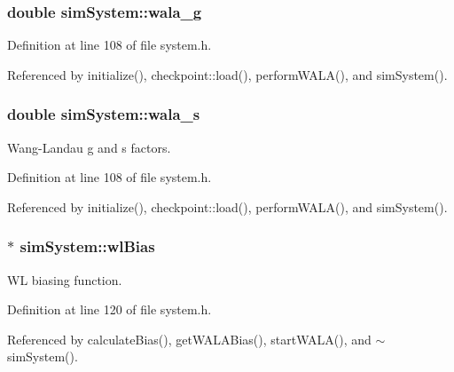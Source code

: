 \hypertarget{classsim_system_aa2e866e69ebe5fa0761894212592175a}{
\subsubsection[{wala\-\_\-g}]{\setlength{\rightskip}{0pt plus 5cm}double sim\-System\-::wala\-\_\-g}}\label{classsim_system_aa2e866e69ebe5fa0761894212592175a}


Definition at line 108 of file system.\-h.



Referenced by initialize(), checkpoint\-::load(), perform\-W\-A\-L\-A(), and sim\-System().

\hypertarget{classsim_system_a7cc3431bb59acca9165b044dbd07dcdc}{
\subsubsection[{wala\-\_\-s}]{\setlength{\rightskip}{0pt plus 5cm}double sim\-System\-::wala\-\_\-s}}\label{classsim_system_a7cc3431bb59acca9165b044dbd07dcdc}


Wang-\/\-Landau g and s factors. 



Definition at line 108 of file system.\-h.



Referenced by initialize(), checkpoint\-::load(), perform\-W\-A\-L\-A(), and sim\-System().

\hypertarget{classsim_system_a6dc8d9f89dfcfa247a59bc50889c49e7}{
\subsubsection[{wl\-Bias}]{$\ast$ sim\-System\-::wl\-Bias}}\label{classsim_system_a6dc8d9f89dfcfa247a59bc50889c49e7}


W\-L biasing function. 



Definition at line 120 of file system.\-h.



Referenced by calculate\-Bias(), get\-W\-A\-L\-A\-Bias(), start\-W\-A\-L\-A(), and $\sim$sim\-System().

